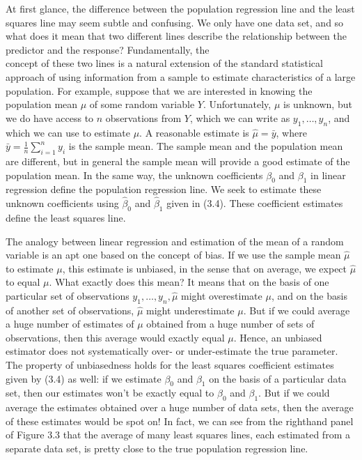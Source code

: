 \documentclass[10pt]{article}
\begin{document}
At first glance, the difference between the population regression line and the least squares line may seem subtle and confusing. We only have one data set, and so what does it mean that two different lines describe the relationship between the predictor and the response? Fundamentally, the\\
concept of these two lines is a natural extension of the standard statistical approach of using information from a sample to estimate characteristics of a large population. For example, suppose that we are interested in knowing the population mean $\mu$ of some random variable $Y$. Unfortunately, $\mu$ is unknown, but we do have access to $n$ observations from $Y$, which we can write as $y_{1}, \ldots, y_{n}$, and which we can use to estimate $\mu$. A reasonable estimate is $\hat{\mu}=\bar{y}$, where $\bar{y}=\frac{1}{n} \sum_{i=1}^{n} y_{i}$ is the sample mean. The sample mean and the population mean are different, but in general the sample mean will provide a good estimate of the population mean. In the same way, the unknown coefficients $\beta_{0}$ and $\beta_{1}$ in linear regression define the population regression line. We seek to estimate these unknown coefficients using $\hat{\beta}_{0}$ and $\hat{\beta}_{1}$ given in (3.4). These coefficient estimates define the least squares line.

The analogy between linear regression and estimation of the mean of a random variable is an apt one based on the concept of bias. If we use the sample mean $\hat{\mu}$ to estimate $\mu$, this estimate is unbiased, in the sense that on average, we expect $\hat{\mu}$ to equal $\mu$. What exactly does this mean? It means that on the basis of one particular set of observations $y_{1}, \ldots, y_{n}, \hat{\mu}$ might overestimate $\mu$, and on the basis of another set of observations, $\hat{\mu}$ might underestimate $\mu$. But if we could average a huge number of estimates of $\mu$ obtained from a huge number of sets of observations, then this average would exactly equal $\mu$. Hence, an unbiased estimator does not systematically over- or under-estimate the true parameter. The property of unbiasedness holds for the least squares coefficient estimates given by (3.4) as well: if we estimate $\beta_{0}$ and $\beta_{1}$ on the basis of a particular data set, then our estimates won't be exactly equal to $\beta_{0}$ and $\beta_{1}$. But if we could average the estimates obtained over a huge number of data sets, then the average of these estimates would be spot on! In fact, we can see from the righthand panel of Figure 3.3 that the average of many least squares lines, each estimated from a separate data set, is pretty close to the true population regression line.
\end{document}
